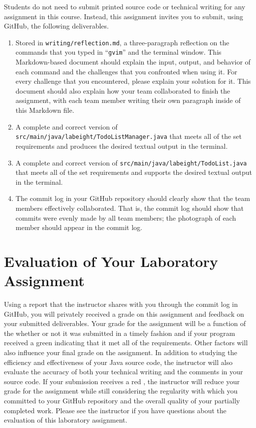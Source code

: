 \documentclass[11pt]{article}
\newcommand{\mainprogramsource}{\lstinline{src/main/java/labeight/TodoListManager.java}}
\newcommand{\secondprogramsource}{\lstinline{src/main/java/labeight/TodoList.java}}
\newcommand{\reflection}{\lstinline{writing/reflection.md}}
\newcommand{\command}[1]{``\lstinline{#1}''}
\newcommand{\checkmark}{\ding{51}}
\newcommand{\naughtmark}{\ding{55}}
\begin{document}
\noindent Students do not need to submit printed source code or technical writing for any assignment in this course.
Instead, this assignment invites you to submit, using GitHub, the following deliverables.

\begin{enumerate}

  \setlength{\itemsep}{0in}

\item Stored in \reflection{}, a three-paragraph reflection on the commands that you typed in \command{gvim} and the
  terminal window. This Markdown-based document should explain the input, output, and behavior of each command and the
  challenges that you confronted when using it. For every challenge that you encountered, please explain your solution
  for it. This document should also explain how your team collaborated to finish the assignment, with each team member
  writing their own paragraph inside of this Markdown file.

\item A complete and correct version of \mainprogramsource{} that meets all of the set requirements and produces the
  desired textual output in the terminal.

\item A complete and correct version of \secondprogramsource{} that meets all of the set requirements and supports the
  desired textual output in the terminal.

\item The commit log in your GitHub repository should clearly show that the team members effectively collaborated. That
  is, the commit log should show that commits were evenly made by all team members; the photograph of each member should
  appear in the commit log.

\end{enumerate}

\section*{Evaluation of Your Laboratory Assignment}

Using a report that the instructor shares with you through the commit log in GitHub, you will privately received a grade
on this assignment and feedback on your submitted deliverables. Your grade for the assignment will be a function of the
whether or not it was submitted in a timely fashion and if your program received a green \checkmark{} indicating that it
met all of the requirements. Other factors will also influence your final grade on the assignment. In addition to
studying the efficiency and effectiveness of your Java source code, the instructor will also evaluate the accuracy of
both your technical writing and the comments in your source code. If your submission receives a red \naughtmark{}, the
instructor will reduce your grade for the assignment while still considering the regularity with which you committed to
your GitHub repository and the overall quality of your partially completed work. Please see the instructor if you have
questions about the evaluation of this laboratory assignment.
\end{document}
